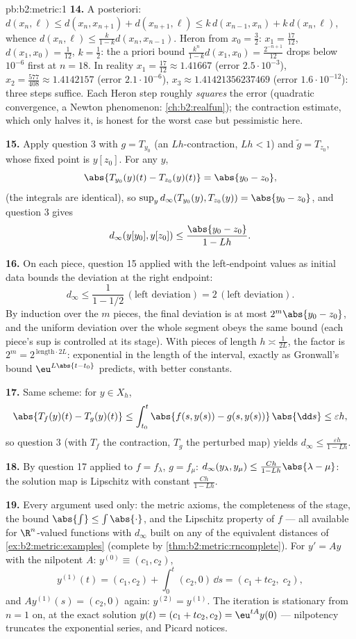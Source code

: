 \begin{solution}{pb:b2:metric:1}
\textbf{14.} A posteriori: $d(x_n, \ell) \leq d(x_n, x_{n+1}) +
d(x_{n+1}, \ell) \leq k\,d(x_{n-1}, x_n) + k\,d(x_n, \ell)$,
whence $d(x_n, \ell) \leq \frac{k}{1-k}d(x_n, x_{n-1})$. Heron
from $x_0 = \frac32$: $x_1 = \frac{17}{12}$, $d(x_1, x_0) =
\frac1{12}$, $k = \frac12$: the a priori bound
$\frac{k^n}{1-k}d(x_1,x_0) = \frac{2^{-n+1}}{12}$ drops below
$10^{-6}$ first at $n = 18$. In reality $x_1 = \frac{17}{12}
\approx 1.41667$ (error $2.5\cdot10^{-3}$), $x_2 =
\frac{577}{408} \approx 1.4142157$ (error $2.1\cdot10^{-6}$),
$x_3 \approx 1.41421356237469$ (error $1.6\cdot10^{-12}$):
three steps suffice. Each Heron step roughly \emph{squares} the
error (quadratic convergence, a Newton phenomenon:
\cref{ch:b2:realfun}); the contraction estimate, which only
halves it, is honest for the worst case but pessimistic here.

\textbf{15.} Apply question 3 with $g = T_{y_0}$ (an
$Lh$-contraction, $Lh < 1$) and $\widetilde g = T_{z_0}$, whose
fixed point is $y[z_0]$. For any $y$,
\[
\abs{T_{y_0}(y)(t) - T_{z_0}(y)(t)} = \abs{y_0 - z_0},
\]
(the integrals are identical), so $\sup_y
d_\infty(T_{y_0}(y), T_{z_0}(y)) = \abs{y_0 - z_0}$, and
question 3 gives
\[
d_\infty(y[y_0], y[z_0]) \leq \frac{\abs{y_0 - z_0}}{1 - Lh} .
\]

\textbf{16.} On each piece, question 15 applied with the
left-endpoint values as initial data bounds the deviation at
the right endpoint:
\[
d_\infty \leq \frac{1}{1 - 1/2}\,(\text{left deviation})
= 2\,(\text{left deviation}) .
\] By
induction over the $m$ pieces, the final deviation is at most
$2^m\abs{y_0 - z_0}$, and the uniform deviation over the whole
segment obeys the same bound (each piece's sup is controlled at
its stage). With pieces of length $h \asymp \frac1{2L}$, the
factor is $2^m = 2^{\,\text{length}\cdot 2L}$: exponential in
the length of the interval, exactly as Gronwall's bound
$\eu^{L\abs{t-t_0}}$ predicts, with better constants.

\textbf{17.} Same scheme: for $y \in X_h$,
\[
\abs{T_f(y)(t) - T_g(y)(t)} \leq \int_{t_0}^t \abs{f(s,y(s)) -
g(s,y(s))}\,\abs{\dd s} \leq \varepsilon h ,
\]
so question 3 (with $T_f$ the contraction, $T_g$ the perturbed
map) yields $d_\infty \leq \frac{\varepsilon h}{1 - Lh}$.

\textbf{18.} By question 17 applied to $f = f_\lambda$, $g =
f_\mu$: $d_\infty(y_\lambda, y_\mu) \leq \frac{Ch}{1 -
Lh}\abs{\lambda - \mu}$: the solution map is Lipschitz with
constant $\frac{Ch}{1-Lh}$.

\textbf{19.} Every argument used only: the metric axioms, the
completeness of the stage, the bound $\abs{\int} \leq
\int\abs{\cdot}$, and the Lipschitz property of $f$ --- all
available for $\R^n$-valued functions with $d_\infty$ built on
any of the equivalent distances of \cref{ex:b2:metric:examples}
(complete by \cref{thm:b2:metric:rncomplete}). For $y' = Ay$
with the nilpotent $A$: $y^{(0)} \equiv (c_1, c_2)$,
\[
y^{(1)}(t) = (c_1, c_2) + \int_0^t (c_2, 0)\,\dd s
= (c_1 + tc_2,\; c_2),
\]
and $Ay^{(1)}(s) = (c_2, 0)$ again: $y^{(2)} = y^{(1)}$. The
iteration is stationary from $n = 1$ on, at the exact solution
$y(t) = (c_1 + tc_2, c_2) = \eu^{tA}y(0)$ --- nilpotency
truncates the exponential series, and Picard notices.


\end{solution}
